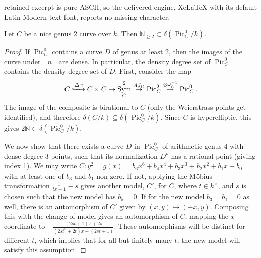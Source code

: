 \documentclass[10pt,a4paper]{amsart}
\DeclareMathOperator{\Sym}{Sym}
\newcommand{\Pic}{\operatorname{Pic}}
\newcommand{\dendegs}{\delta}
\newcommand{\nn}{\mathbb{N}}
\begin{document}
retained excerpt is pure ASCII, so the delivered engine, XeLaTeX with its default Latin Modern text font, reports no missing character.
\begin{thm}\label{thm:Jac of genus 2} 
Let $C$ be a nice genus $2$ curve over $k$. 
Then $\nn_{\geq 2}\subset\dendegs(\Pic^0_C/k)$. 
\end{thm}

\begin{proof}
    If $\Pic^0_C$ contains a curve $D$ of genus at least 2, then the images of the curve under $[n]$ are dense. 
    In particular, the density degree set of $\Pic^0_C$ contains the density degree set of $D$. 
    First, consider the map 
    \[
        C\xhookrightarrow{\Delta_C} C\times C \to \Sym^2_C \overset{AJ_C}{\to} \Pic^2_C \overset{\otimes \omega_C^{-1}}{\to} \Pic^0_C.
    \]
    The image of the composite is birational to $C$ (only the Weierstrass points get identified), and therefore $\dendegs(C/k)\subseteq \dendegs(\Pic^0_C/k)$. Since $C$ is hyperelliptic, this gives $2\nn\subset \dendegs(\Pic^0_C/k)$.
    
    We now show that there exists a curve $D$ in $\Pic^0_C$ of arithmetic genus 4 with dense degree 3 points, such that its normalization $D^\nu$ has a rational point (giving index 1).
    We may write $C : y^2 = g(x) = b_6 x^6 + b_4 x^4 + b_3 x^3 + b_2 x^2 + b_1 x + b_0$ with at least one of $b_3$ and $b_1$ non-zero. 
    If not, applying the M\"obius transformation $\frac{1}{tx + 1} - s$ gives another model, $C'$, for $C$, where $t \in k^\times$, and $s$ is chosen such that the new model has $b_5 = 0$. If for the new model $b_3 = b_1 = 0$ as well, there is an automorphism of $C'$ given by $(x, y) \mapsto (-x, y)$. Composing this with the change of model gives an automorphism of $C$, mapping the $x$-coordinate to $-\frac{(2st + 1)x + 2s}{(2st^2 + 2t)x + (2st + 1)}$. These automorphisms will be distinct for different $t$, which implies that for all but finitely many $t$, the new model will satisfy this assumption.
    

\end{proof}
\end{document}
